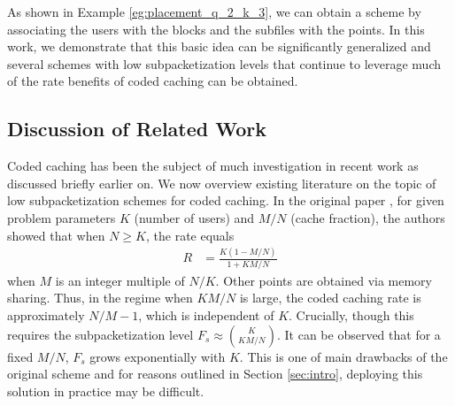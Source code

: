 \documentclass[journal,twocolumn]{IEEEtran}
\theoremstyle{definition}
\begin{document}
As shown in Example \ref{eg:placement_q_2_k_3}, we can obtain a scheme by associating the users with the blocks and the subfiles with the points. In this work, we demonstrate that this basic idea can be significantly generalized and several schemes with low subpacketization levels that continue to leverage much of the rate benefits of coded caching can be obtained. %

\subsection{Discussion of Related Work}
\label{sec:related_work}
Coded caching has been the subject of much investigation in recent work as discussed briefly earlier on. We now overview existing literature on the topic of low subpacketization schemes for coded caching.
In the original paper \cite{maddahN14}, for given problem parameters $K$ (number of users) and $M/N$ (cache fraction), the authors showed that when $N \geq K$, the rate equals
\begin{align*}
R &= \frac{K(1 - M/N)}{1 + KM/N}
\end{align*}
when $M$ is an integer multiple of $N/K$. Other points are obtained via memory sharing.
Thus, in the regime when $KM/N$ is large, the coded caching rate is approximately $N/M - 1$, which is independent of $K$. Crucially, though this requires the subpacketization level $F_s \approx \binom{K}{KM/N}$. It can be observed that for a fixed $M/N$, $F_s$ grows exponentially with $K$. This is one of main drawbacks of the original scheme and for reasons outlined in Section \ref{sec:intro}, deploying this solution in practice may be difficult.
\end{document}
